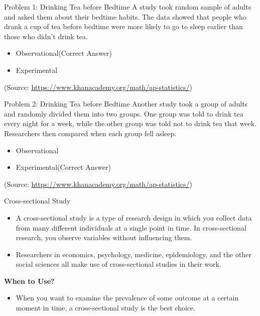 \begin{frame}[t]{Problem 1: Drinking Tea before Bedtime}
	A study took random sample of adults and asked them about their bedtime 
	habits. The data showed that people who drank a cup of tea before bedtime 
	were more likely to go to sleep earlier than those who didn't drink tea.
	\begin{itemize}
		\item Observational(Correct Answer)
		\item Experimental
	\end{itemize}
\centering
(Source: \url{https://www.khanacademy.org/math/ap-statistics/})
\end{frame}

\begin{frame}[t]{Problem 2: Drinking Tea before Bedtime}
	Another study took a group of adults and randomly divided them into two 
	groups. One group was told to drink tea every night for a week, while the 
	other group was told not to drink tea that week. Researchers then compared 
	when each group fell asleep.
	\begin{itemize}
		\item Observational
		\item Experimental(Correct Answer)
	\end{itemize}
\centering
(Source: \url{https://www.khanacademy.org/math/ap-statistics/})
\end{frame}

\begin{frame}[t]{Cross-sectional Study}
	\begin{itemize}
		\item A cross-sectional study is a type of research design in which you 
		collect data from many different individuals at a single point in time. 
		In cross-sectional research, you observe variables without influencing 
		them.
		\item Researchers in economics, psychology, medicine, epidemiology, and 
		the other social sciences all make use of cross-sectional studies in 
		their work.
		
	
	\end{itemize}
\textbf{When to Use?}
\begin{itemize}
	\item When you want to examine the prevalence of some outcome at a 
	certain moment in time, a cross-sectional study is the best choice.
\end{itemize}
\end{frame}


